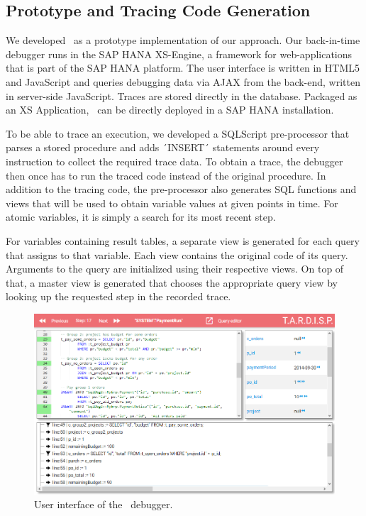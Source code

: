 \subsection{Prototype and Tracing Code Generation}

We developed \tool\ as a prototype implementation of our approach.
Our back-in-time debugger runs in the SAP HANA XS-Engine, a framework for web-applications that is part of the SAP HANA platform.
The user interface is written in HTML5 and JavaScript and queries debugging data via AJAX from the back-end, written in server-side JavaScript.
Traces are stored directly in the database.
Packaged as an XS Application, \tool\ can be directly deployed in a SAP HANA installation.


To be able to trace an execution, we developed a SQLScript pre-processor that parses a stored procedure and adds ´INSERT´ statements around every instruction to collect the required trace data.
To obtain a trace, the debugger then once has to run the traced code instead of the original procedure.
In addition to the tracing code, the pre-processor also generates SQL functions and views that will be used to obtain variable values at given points in time.
For atomic variables, it is simply a search for its most recent step.

For variables containing result tables, a separate view is generated for each query that assigns to that variable.
Each view contains the original code of its query.
Arguments to the query are initialized using their respective views.
On top of that, a master view is generated that chooses the appropriate query view by looking up the requested step in the recorded trace.

\begin{figure}
	\centering
		\includegraphics[width=\linewidth]{img/odb.png}
	\caption{User interface of the \tool\ debugger.}
	\label{fig:odb}
\end{figure}

